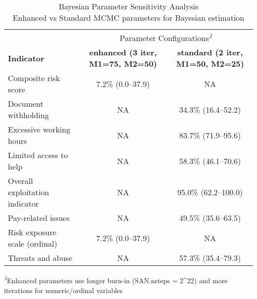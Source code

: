 \begin{table}[t]
\caption*{
{\large Bayesian Parameter Sensitivity Analysis} \\ 
{\small Enhanced vs Standard MCMC parameters for Bayesian estimation}
} 
\fontsize{8.2pt}{9.9pt}\selectfont
\begin{tabular*}{\linewidth}{@{\extracolsep{\fill}}lcc}
\toprule
 & \multicolumn{2}{c}{Parameter Configurations\textsuperscript{\textit{1}}} \\ 
\cmidrule(lr){2-3}
{\bfseries Indicator} & {\bfseries enhanced (3 iter, M1=75, M2=50)} & {\bfseries standard (2 iter, M1=50, M2=25)} \\ 
\midrule\addlinespace[2.5pt]
Composite risk score & 7.2\% (0.0–37.9) & NA \\ 
Document withholding & NA & 34.3\% (16.4–52.2) \\ 
Excessive working hours & NA & 83.7\% (71.9–95.6) \\ 
Limited access to help & NA & 58.3\% (46.1–70.6) \\ 
Overall exploitation indicator & NA & 95.0\% (62.2–100.0) \\ 
Pay-related issues & NA & 49.5\% (35.6–63.5) \\ 
Risk exposure scale (ordinal) & 7.2\% (0.0–37.9) & NA \\ 
Threats and abuse & NA & 57.3\% (35.4–79.3) \\ 
\bottomrule
\end{tabular*}
\begin{minipage}{\linewidth}
\textsuperscript{\textit{1}}Enhanced parameters use longer burn-in (SAN.nsteps = 2\textasciicircum{}22) and more iterations for numeric/ordinal variables\\
\end{minipage}
\end{table}

